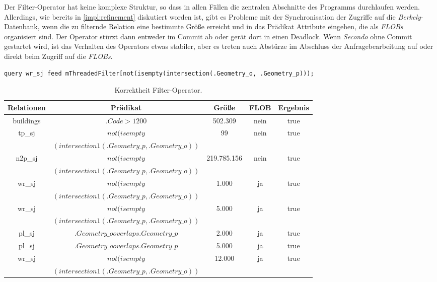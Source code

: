 \documentclass[a4paper,12pt,twoside]{article}
\newcommand{\Fb}[1]{\textit{#1}} %
\begin{document}
Der Filter-Operator hat keine komplexe Struktur, so dass in allen Fällen die zentralen Abschnitte des Programms durchlaufen werden. Allerdings, wie bereits in \autoref{impl:refinement} diskutiert worden ist, gibt es Probleme mit der Synchronisation der Zugriffe auf die \Fb{Berkely}-Datenbank, wenn die zu filternde Relation eine bestimmte Größe erreicht und in das Prädikat Attribute eingehen, die als \Fb{FLOBs} organisiert sind. Der Operator stürzt dann entweder im Commit ab oder gerät dort in einen Deadlock. Wenn \Fb{Secondo} ohne Commit gestartet wird, ist das Verhalten des Operators etwas stabiler, aber es treten auch Abstürze im Abschluss der Anfragebearbeitung auf oder direkt beim Zugriff auf die \Fb{FLOBs}.

\begin{minipage}{0.95\textwidth}
	\begin{lstlisting}[caption={Testquery für den Filter-Operator, die auf Schnittpunkte zwischen Straßen und Wasserwegen prüft.}, label=list:testfilter]
	query wr_sj feed mThreadedFilter[not(isempty(intersection(.Geometry_o, .Geometry_p)));
	\end{lstlisting}
\end{minipage}

\begin{table}
	\centering
	\begin{tabular}{|c|c|c|c|c|}
		\hline
		\rowcolor{gray!30}
		Relationen & Prädikat & Größe & FLOB & Ergebnis \\ 
		\hline 
		buildings & $.Code > 1200$ & 502.309 & nein & true \\ 
		\hline 
		tp\_sj \footnotemark & $not(isempty$ & 99 & nein & true \\
		 & $(intersection1(.Geometry\_p, .Geometry\_o))$ &  &  &  \\ 
		\hline
		n2p\_sj \footnotemark & $not(isempty$ & 219.785.156
		 & nein & true \\
		& $(intersection1(.Geometry\_p, .Geometry\_o))$ &  &  &  \\ 
		\hline
		wr\_sj \footnotemark & $not(isempty$ & 1.000 & ja & true \\ 
		 & $(intersection1(.Geometry\_p, .Geometry\_o))$ &  &  &  \\ 
		\hline
		wr\_sj  & $not(isempty$ & 5.000 & ja & true \\
		 & $(intersection1(.Geometry\_p, .Geometry\_o))$ &  &  &  \\  
		\hline
		pl\_sj \footnotemark & $.Geometry\_o overlaps .Geometry\_p$ & 2.000 & ja & true \\ 
		\hline
		pl\_sj  & $.Geometry\_o overlaps .Geometry\_p$ & 5.000 & ja & true \\ 
		\hline
		wr\_sj  & $not(isempty$ & 12.000 & ja & true \\
		 & $(intersection1(.Geometry\_p, .Geometry\_o))$ &  &  &  \\  
		\hline
	\end{tabular}
	\caption{\label{tab:testFilter}Korrektheit Filter-Operator.}
\end{table}
\end{document}
